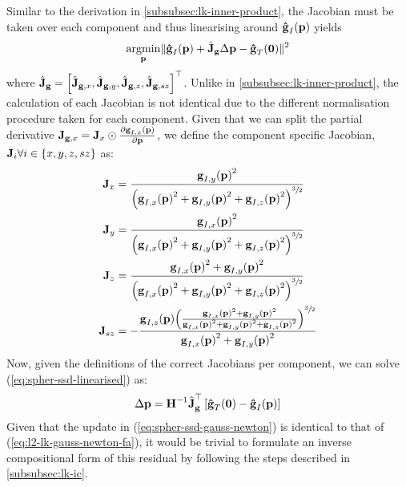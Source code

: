 Similar to the derivation in \cref{subsubsec:lk-inner-product}, the Jacobian
must be taken over each component and thus linearising around
$\bb{\hat{g}}_I(\p)$ yields
\begin{equation}\label{eq:spher-ssd-linearised}
    \argmin_{\p} \norm{\bb{\hat{g}}_{I}(\p) + \hat{\bb{J}}_{\bb{g}} \Delta \p - \bb{\hat{g}}_{T}(\zero)}^2
\end{equation}
where
$\hat{\bb{J}}_{\bb{g}} = {\left[ \hat{\bb{J}}_{\bb{g},x}, \hat{\bb{J}}_{\bb{g},y}, \hat{\bb{J}}_{\bb{g},z}, \hat{\bb{J}}_{\bb{g},sz} \right]}^{\top}$. 
Unlike in \cref{subsubsec:lk-inner-product}, the calculation of each 
Jacobian is not identical due to the different normalisation procedure taken 
for each component. Given that we can split the partial derivative
$\bb{J}_{\bb{g},x} = \bb{J}_x \odot \frac{\partial \bb{g}_{I,x}(\p)}{\partial \p}$, 
we define the component specific Jacobian,
$\bb{J}_i \nobreak \forall \nobreak i \in \nobreak \{ x,y,z,sz \}$ as:
\begin{equation}\label{eq:spher-ssd-chain-rule}
    \begin{aligned}
        \bb{J}_x    &= \frac{{\bb{g}_{I,y}(\p)}^2}{{\left({\bb{g}_{I,x}(\p)}^2 + {\bb{g}_{I,y}(\p)}^2 + {\bb{g}_{I,z}(\p)}^2 \right)}^{\sfrac{3}{2}}} \\
        \bb{J}_y    &= \frac{{\bb{g}_{I,x}(\p)}^2}{{\left({\bb{g}_{I,x}(\p)}^2 + {\bb{g}_{I,y}(\p)}^2 + {\bb{g}_{I,z}(\p)}^2 \right)}^{\sfrac{3}{2}}} \\
        \bb{J}_z    &= \frac{{\bb{g}_{I,x}(\p)}^2 + {\bb{g}_{I,y}(\p)}^2}{{\left({\bb{g}_{I,x}(\p)}^2 + {\bb{g}_{I,y}(\p)}^2 + {\bb{g}_{I,z}(\p)}^2 \right)}^{\sfrac{3}{2}}} \\
        \bb{J}_{sz} &= - \frac{\bb{g}_{I,z}(\p) {\left( \frac{{\bb{g}_{I,x}(\p)}^2 + {\bb{g}_{I,y}(\p)}^2}{{\bb{g}_{I,x}(\p)}^2 + {\bb{g}_{I,y}(\p)}^2 + {\bb{g}_{I,z}(\p)}^2} \right)}^{\sfrac{3}{2}}}{{\bb{g}_{I,x}(\p)}^2 + {\bb{g}_{I,y}(\p)}^2}
    \end{aligned}
\end{equation}
Now, given the definitions of the correct Jacobians per component, we can solve 
(\ref{eq:spher-ssd-linearised}) as:
\begin{equation}\label{eq:spher-ssd-gauss-newton}
    \Delta \p = \bb{H}^{-1} \hat{\bb{J}}_{\bb{g}}^{\top} \left[ \bb{\hat{g}}_{T}(\zero) - \bb{\hat{g}}_{I}(\p) \right]
\end{equation}
Given that the update in (\ref{eq:spher-ssd-gauss-newton}) is identical to that
of (\ref{eq:l2-lk-gauss-newton-fa}), it would be trivial to formulate an inverse
compositional form of this residual by following the steps described in
\cref{subsubsec:lk-ic}.
